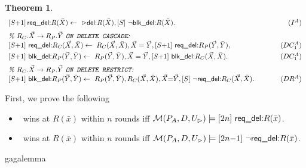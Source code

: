 \documentclass[twoside,11pt]{article}
\newtheorem{Theorem}{Theorem}
\theoremstyle{plain}
\def\rdel{\itorsf{req\_del:}}
\def\bdel{\itorsf{blk\_del:}}
\begin{document}
\begin{Theorem}
\begin{displaymath}
  \begin{array}{l@{\ }r}
    \sterm{S{+}1}\,\rdel R(\bar X) \la\  \extev \del
    R(\bar X), \sterm{S}\ \neg \bdel R(\bar X).  & (I^A) \medskip \\ 
    \textit{\% $R_{C}.\vec X \to R_{P}.\vec Y$ \texttt{ON DELETE
        CASCADE}:} \\ 
    \sterm{S{+}1}\ \rdel R_C(\vec X,\bar X) \la\ R_C(\vec X, \bar X),
    \vec X = \vec Y, \sterm{S{+}1}\ \rdel R_P(\vec Y,\bar Y), &
    (DC_1^A) \smallskip \\ 
    \sterm{S{+}1}\ \bdel R_P(\vec Y,\bar Y) \la\ R_P(\vec Y,\bar Y),
    \vec X = \vec Y, \sterm{S{+}1}\ \bdel R_C(\vec X,\bar X).  &
    (DC_1^A) \medskip \\ 
    \textit{\% $R_{C}.\vec X \to R_{P}.\vec Y$ \texttt{ON DELETE
        RESTRICT}:} \\ 
    \sterm{S{+}1}\ \bdel R_P(\vec Y,\bar Y) \la\ R_P(\vec Y,\bar Y),
    R_C(\vec X,\bar X), \vec X {=} \vec Y, \sterm{S}\ \neg \rdel
    R_C(\vec X,\bar X). \hspace{1.2cm}  & (DR^A)
\end{array}
\end{displaymath}
\end{Theorem}

First,  we  prove the following 
\begin{Lemma}\label{WinWFSAux}
  \begin{itemize}
  \item  \I\ wins  at  $R(\bar x)$ within $n$
    rounds iff $\pl M(P_A,D,U_\rhd) \models \sterm{2n}\ \rdel R(\bar
    x)$.
  \item \II\ wins at $R(\bar x)$ within $n$ rounds iff $\pl
    M(P_A,D,U_\rhd) \models \sterm{2n{-}1}\ \neg \rdel R(\bar x)$.
 \end{itemize}
 gagalemma
\end{Lemma}
\end{document}
